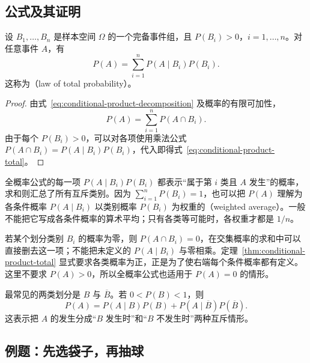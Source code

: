 \documentclass[UTF8]{ctexart}
\begin{document}
\subsection{公式及其证明}

\begin{theorem}[全概率公式]
\label{thm:conditional-product-total}
设 $B_1,\ldots,B_n$ 是样本空间 $\Omega$ 的一个完备事件组，且 $P(B_i)>0$，$i=1,\ldots,n$。对任意事件 $A$，有
\begin{equation}
  P(A)=\sum_{i=1}^{n}P(A\mid B_i)P(B_i).
  \label{eq:conditional-product-total}
\end{equation}
这称为（law of total probability）。
\end{theorem}
\begin{proof}
由式~\eqref{eq:conditional-product-decomposition} 及概率的有限可加性，
\[
  P(A)=\sum_{i=1}^{n}P(A\cap B_i).
\]
由于每个 $P(B_i)>0$，可以对各项使用乘法公式 $P(A\cap B_i)=P(A\mid B_i)P(B_i)$，代入即得式~\eqref{eq:conditional-product-total}。
\end{proof}

全概率公式的每一项 $P(A\mid B_i)P(B_i)$ 都表示“属于第 $i$ 类且 $A$ 发生”的概率，求和则汇总了所有互斥类别。因为 $\sum_{i=1}^{n}P(B_i)=1$，也可以把 $P(A)$ 理解为各条件概率 $P(A\mid B_i)$ 以类别概率 $P(B_i)$ 为权重的（weighted average）。一般不能把它写成各条件概率的算术平均；只有各类等可能时，各权重才都是 $1/n$。

若某个划分类别 $B_i$ 的概率为零，则 $P(A\cap B_i)=0$，在交集概率的求和中可以直接删去这一项；不能把未定义的 $P(A\mid B_i)$ 与零相乘。定理~\ref{thm:conditional-product-total} 显式要求各类概率为正，正是为了使右端每个条件概率都有定义。这里不要求 $P(A)>0$，所以全概率公式也适用于 $P(A)=0$ 的情形。

最常见的两类划分是 $B$ 与 $\overline B$。若 $0<P(B)<1$，则
\begin{equation}
  P(A)=P(A\mid B)P(B)
       +P(A\mid\overline B)P(\overline B).
  \label{eq:conditional-product-total-binary}
\end{equation}
这表示把 $A$ 的发生分成“$B$ 发生时”和“$B$ 不发生时”两种互斥情形。

\subsection{例题：先选袋子，再抽球}
\end{document}
